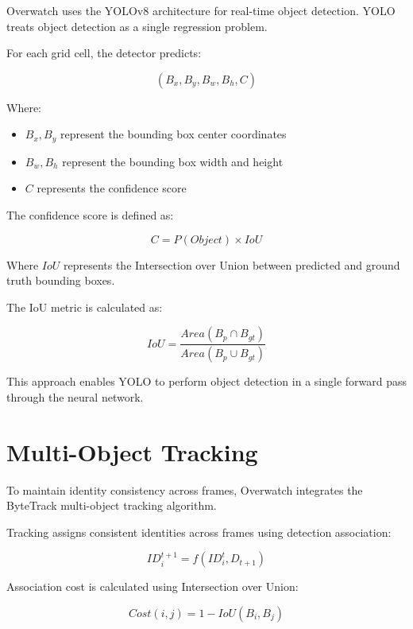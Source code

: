 \documentclass[conference]{IEEEtran}
\begin{document}
Overwatch uses the YOLOv8 architecture for real-time object detection. YOLO treats object detection as a single regression problem.

For each grid cell, the detector predicts:

\begin{equation}
(B_x, B_y, B_w, B_h, C)
\end{equation}

Where:

\begin{itemize}
\item $B_x, B_y$ represent the bounding box center coordinates
\item $B_w, B_h$ represent the bounding box width and height
\item $C$ represents the confidence score
\end{itemize}

The confidence score is defined as:

\begin{equation}
C = P(Object) \times IoU
\end{equation}

Where $IoU$ represents the Intersection over Union between predicted and ground truth bounding boxes.

The IoU metric is calculated as:

\begin{equation}
IoU = \frac{Area(B_p \cap B_{gt})}{Area(B_p \cup B_{gt})}
\end{equation}

This approach enables YOLO to perform object detection in a single forward pass through the neural network.

\section{Multi-Object Tracking}

To maintain identity consistency across frames, Overwatch integrates the ByteTrack multi-object tracking algorithm.

Tracking assigns consistent identities across frames using detection association:

\begin{equation}
ID_i^{t+1} = f(ID_i^t, D_{t+1})
\end{equation}

Association cost is calculated using Intersection over Union:

\begin{equation}
Cost(i,j) = 1 - IoU(B_i, B_j)
\end{equation}
\end{document}
